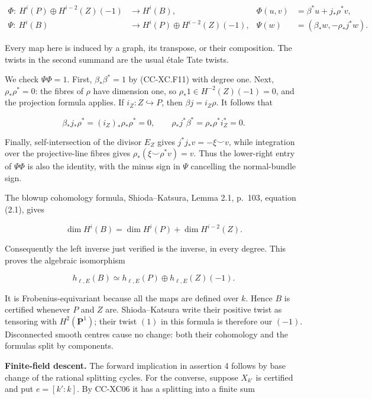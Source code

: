 \[
 \begin{aligned}
 \Phi:\ H^i(P)\oplus H^{i-2}(Z)(-1)&\longrightarrow H^i(B),
 &\Phi(u,v)&=\beta^*u+j_*\rho^*v,\\
 \Psi:\ H^i(B)&\longrightarrow H^i(P)\oplus H^{i-2}(Z)(-1),
 &\Psi(w)&=(\beta_*w,-\rho_*j^*w).
 \end{aligned}
 \tag{CC-XC.F12}
\]

Every map here is induced by a graph, its transpose, or their
composition. The twists in the second summand are the usual étale Tate
twists.

We check \(\Psi\Phi=1\). First, \(\beta_*\beta^*=1\) by (CC-XC.F11) with
degree one. Next, \(\rho_*\rho^*=0\): the fibres of \(\rho\) have
dimension one, so \(\rho_*1\in H^{-2}(Z)(-1)=0\), and the projection
formula applies. If \(i_Z:Z\hookrightarrow P\), then
\(\beta j=i_Z\rho\). It follows that

\[
 \beta_*j_*\rho^*=(i_Z)_*\rho_*\rho^*=0,\qquad
 \rho_*j^*\beta^*=\rho_*\rho^*i_Z^*=0.
\]

Finally, self-intersection of the divisor \(E_Z\) gives
\(j^*j_*v=-\xi\smile v\), while integration over the projective-line
fibres gives \(\rho_*(\xi\smile\rho^*v)=v\). Thus the lower-right entry
of \(\Psi\Phi\) is also the identity, with the minus sign in \(\Psi\)
cancelling the normal-bundle sign.

The blowup cohomology formula, Shioda--Katsura, Lemma 2.1, p.~103,
equation (2.1), gives

\[
 \dim H^i(B)=\dim H^i(P)+\dim H^{i-2}(Z).
\]

Consequently the left inverse just verified is the inverse, in every
degree. This proves the algebraic isomorphism

\[
 h_{\ell,E}(B)\simeq h_{\ell,E}(P)\oplus h_{\ell,E}(Z)(-1).
 \tag{CC-XC.F13}
\]

It is Frobenius-equivariant because all the maps are defined over \(k\).
Hence \(B\) is certified whenever \(P\) and \(Z\) are. Shioda--Katsura
write their positive twist as tensoring with \(H^2(\mathbf P^1)\); their
twist \((1)\) in this formula is therefore our \((-1)\). Disconnected
smooth centres cause no change: both their cohomology and the formulas
split by components.

\textbf{Finite-field descent.} The forward implication in assertion 4
follows by base change of the rational splitting cycles. For the
converse, suppose \(X_{k'}\) is certified and put \(e=[k':k]\). By
CC-XC06 it has a splitting into a finite sum


